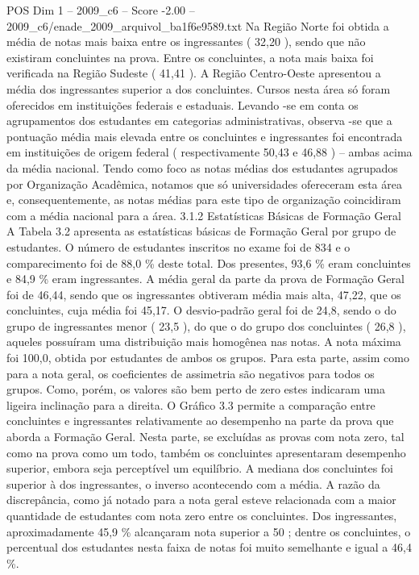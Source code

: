 \begin{textsample}{POS Dim 1 – 2009\_c6 – Score -2.00 – 2009\_c6/enade\_2009\_arquivol\_ba1f6e9589.txt}
Na Região Norte foi obtida a média de notas mais baixa entre os ingressantes ( 32,20 ), sendo que não existiram concluintes na prova.
Entre os concluintes, a nota mais baixa foi verificada na Região Sudeste ( 41,41 ).
A Região Centro-Oeste apresentou a média dos ingressantes superior a dos concluintes.
Cursos nesta área só foram oferecidos em instituições federais e estaduais.
Levando -se em conta os agrupamentos dos estudantes em categorias administrativas, observa -se que a pontuação média mais elevada entre os concluintes e ingressantes foi encontrada em instituições de origem federal ( respectivamente 50,43 e 46,88 ) – ambas acima da média nacional.
Tendo como foco as notas médias dos estudantes agrupados por Organização Acadêmica, notamos que só universidades ofereceram esta área e, consequentemente, as notas médias para este tipo de organização coincidiram com a média nacional para a área. 3.1.2 Estatísticas Básicas de Formação Geral A Tabela 3.2 apresenta as estatísticas básicas de Formação Geral por grupo de estudantes.
O número de estudantes inscritos no exame foi de 834 e o comparecimento foi de 88,0 \% deste total.
Dos presentes, 93,6 \% eram concluintes e 84,9 \% eram ingressantes.
A média geral da parte da prova de Formação Geral foi de 46,44, sendo que os ingressantes obtiveram média mais alta, 47,22, que os concluintes, cuja média foi 45,17.
O desvio-padrão geral foi de 24,8, sendo o do grupo de ingressantes menor ( 23,5 ), do que o do grupo dos concluintes ( 26,8 ), aqueles possuíram uma distribuição mais homogênea nas notas.
A nota máxima foi 100,0, obtida por estudantes de ambos os grupos.
Para esta parte, assim como para a nota geral, os coeficientes de assimetria são negativos para todos os grupos.
Como, porém, os valores são bem perto de zero estes indicaram uma ligeira inclinação para a direita.
O Gráfico 3.3 permite a comparação entre concluintes e ingressantes relativamente ao desempenho na parte da prova que aborda a Formação Geral.
Nesta parte, se excluídas as provas com nota zero, tal como na prova como um todo, também os concluintes apresentaram desempenho superior, embora seja perceptível um equilíbrio.
A mediana dos concluintes foi superior à dos ingressantes, o inverso acontecendo com a média.
A razão da discrepância, como já notado para a nota geral esteve relacionada com a maior quantidade de estudantes com nota zero entre os concluintes.
Dos ingressantes, aproximadamente 45,9 \% alcançaram nota superior a 50 ; dentre os concluintes, o percentual dos estudantes nesta faixa de notas foi muito semelhante e igual a 46,4 \%.

\end{textsample}
